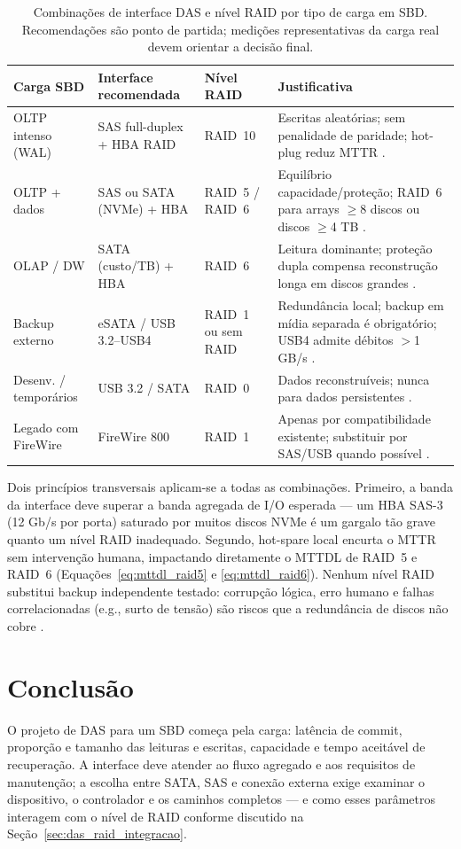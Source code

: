 \documentclass[titlepage]{article}
\begin{document}
\begin{table}[htbp]
\centering\footnotesize
\begin{tabularx}{\textwidth}{p{}p{}p{}X}
\toprule
Carga SBD & Interface recomendada & Nível RAID & Justificativa \\
\midrule
OLTP intenso (WAL) & SAS full-duplex + HBA RAID & RAID~10 & Escritas aleatórias; sem penalidade de paridade; hot-plug reduz MTTR \cite{silberschatz2020}. \\
OLTP + dados & SAS ou SATA (NVMe) + HBA & RAID~5 / RAID~6 & Equilíbrio capacidade/proteção; RAID~6 para arrays $\geq$8 discos ou discos $\geq$4 TB \cite{silberschatz2020,plank2008}. \\
OLAP / DW & SATA (custo/TB) + HBA & RAID~6 & Leitura dominante; proteção dupla compensa reconstrução longa em discos grandes \cite{elmasri2016}. \\
Backup externo & eSATA / USB 3.2--USB4 & RAID~1 ou sem RAID & Redundância local; backup em mídia separada é obrigatório; USB4 admite débitos $>$1 GB/s \cite{usb4_announcement}. \\
Desenv. / temporários & USB 3.2 / SATA & RAID~0 & Dados reconstruíveis; nunca para dados persistentes \cite{silberschatz2020}. \\
Legado com FireWire & FireWire 800 & RAID~1 & Apenas por compatibilidade existente; substituir por SAS/USB quando possível \cite{ti_firewire}. \\
\bottomrule
\end{tabularx}
\caption{Combinações de interface DAS e nível RAID por tipo de carga em SBD. Recomendações são ponto de partida; medições representativas da carga real devem orientar a decisão final.}
\label{tab:das_raid_recomendacao}
\end{table}

Dois princípios transversais aplicam-se a todas as combinações. Primeiro, a banda da interface deve superar a banda agregada de I/O esperada --- um HBA SAS-3 (12 Gb/s por porta) saturado por muitos discos NVMe é um gargalo tão grave quanto um nível RAID inadequado. Segundo, hot-spare local encurta o MTTR sem intervenção humana, impactando diretamente o MTTDL de RAID~5 e RAID~6 (Equações~\ref{eq:mttdl_raid5} e \ref{eq:mttdl_raid6}). Nenhum nível RAID substitui backup independente testado: corrupção lógica, erro humano e falhas correlacionadas (e.g., surto de tensão) são riscos que a redundância de discos não cobre \cite{krioukov2008}.

\section{Conclusão}
\label{sec:conclusao}
O projeto de DAS para um SBD começa pela carga: latência de commit, proporção e tamanho das leituras e escritas, capacidade e tempo aceitável de recuperação. A interface deve atender ao fluxo agregado e aos requisitos de manutenção; a escolha entre SATA, SAS e conexão externa exige examinar o dispositivo, o controlador e os caminhos completos --- e como esses parâmetros interagem com o nível de RAID conforme discutido na Seção~\ref{sec:das_raid_integracao}.
\end{document}
